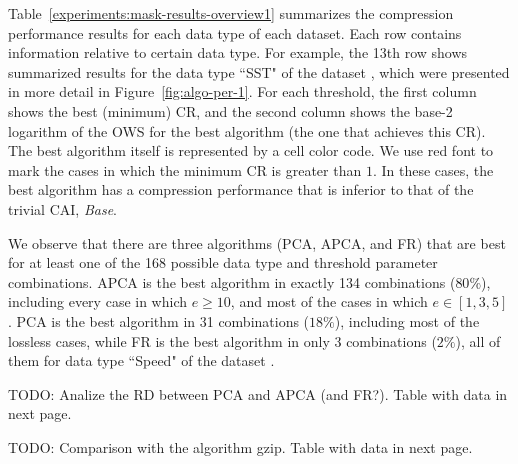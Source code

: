 Table~\ref{experiments:mask-results-overview1} summarizes the compression performance results for each data type of each dataset. Each row contains information relative to certain data type. For example, the 13th row shows summarized results for the data type ``SST" of the dataset \datasetelnino, which were presented in more detail in Figure~\ref{fig:algo-per-1}. For each threshold, the first column shows the best (minimum) CR, and the second column shows the base-2 logarithm of the OWS for the best algorithm (the one that achieves this CR). The best algorithm itself is represented by a cell color code. We use red font to mark the cases in which the minimum CR is greater than $1$. In these cases, the best algorithm has a compression performance that is inferior to that of the trivial CAI, \textit{Base}.


We observe that there are three algorithms (PCA, APCA, and FR) that are best for at least one of the 168 possible data type and threshold parameter combinations. APCA is the best algorithm in exactly 134 combinations ($80\%$), including every case in which $e \geq 10$, and most of the cases in which $e \in [1, 3, 5]$. PCA is the best algorithm in 31 combinations ($18\%$), including most of the lossless cases, while FR is the best algorithm in only 3 combinations ($2\%$), all of them for data type ``Speed" of the dataset \datasetwind.





\clearpage

TODO: Analize the RD between PCA and APCA (and FR?). Table with data in next page.
\clearpage

\clearpage

\clearpage

\clearpage

\clearpage

\clearpage

\clearpage

\clearpage

\clearpage

TODO: Comparison with the algorithm gzip. Table with data in next page.

\clearpage



